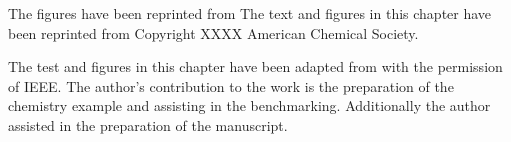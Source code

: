 The figures have been reprinted from %
The text and figures in this chapter have been reprinted from %
Copyright XXXX American Chemical Society. %

The test and figures in this chapter have been adapted from  with the permission of IEEE.
The author's contribution to the work is the preparation of the chemistry example and assisting in the benchmarking. Additionally the author assisted in the preparation of the manuscript.
